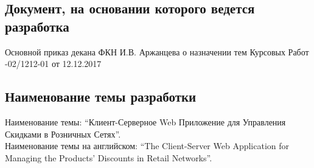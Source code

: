 \subsection{Документ, на основании которого ведется разработка}
Основной приказ декана ФКН И.В. Аржанцева о назначении тем Курсовых Работ
-02/1212-01 от 12.12.2017

\subsection{Наименование темы разработки}
Наименование темы: ``Клиент-Серверное Web Приложение для Управления Скидками в Розничных Сетях''. \\
Наименование темы на английском: ``The Client-Server Web Application for Managing the Products' Discounts in Retail Networks''. \\
